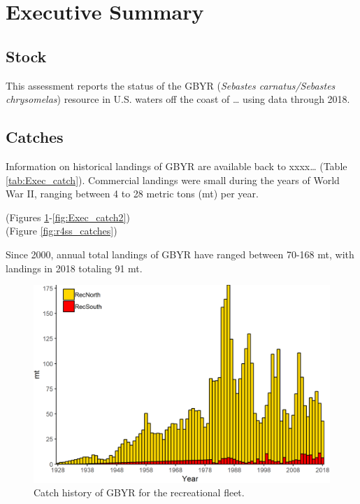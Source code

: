 \documentclass[12pt,]{article}
\begin{document}
{
\setcounter{tocdepth}{4}
\tableofcontents
}
\setlength{\parskip}{5mm plus1mm minus1mm} \pagebreak

\setcounter{page}{1} \renewcommand{\thefigure}{\alph{figure}}
\renewcommand{\thetable}{\alph{table}}

\section*{Executive Summary}\label{executive-summary}

\subsection*{Stock}\label{stock}

This assessment reports the status of the GBYR
(\emph{Sebastes carnatus/Sebastes chrysomelas}) resource in U.S. waters
off the coast of \ldots{} using data through 2018.

\subsection*{Catches}\label{catches}

Information on historical landings of GBYR are available back to
xxxx\ldots{} (Table \ref{tab:Exec_catch}). Commercial landings were
small during the years of World War II, ranging between 4 to 28 metric
tons (mt) per year.

(Figures \ref{fig:Exec_catch1}-\ref{fig:Exec_catch2})\\
(Figure \ref{fig:r4ss_catches})

Since 2000, annual total landings of GBYR have ranged between 70-168 mt,
with landings in 2018 totaling 91 mt.

\FloatBarrier

\begin{figure}
\centering
\includegraphics{Figures/rec_exec.png}
\caption{Catch history of GBYR for the recreational fleet.
\label{fig:Exec_catch1}}
\end{figure}
\end{document}
